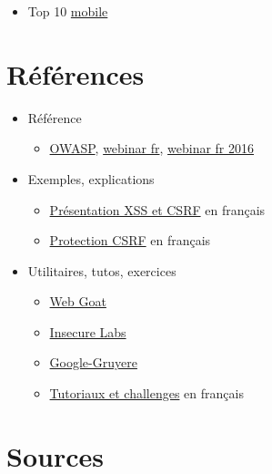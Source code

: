 \begin{itemize}
\tightlist
\item
  Top 10
  \href{https://www.owasp.org/index.php/Mobile_Top_10_2016-Top_10}{mobile}
\end{itemize}

\hypertarget{ruxe9fuxe9rences}{%
\section{Références}\label{ruxe9fuxe9rences}}

\begin{itemize}
\tightlist
\item
  Référence

  \begin{itemize}
  \tightlist
  \item
    \href{https://www.owasp.org/index.php/Main_Page}{OWASP},
    \href{https://www.youtube.com/watch?v=uJwoctrxyNs}{webinar fr},
    \href{https://www.youtube.com/watch?v=pHI2zitLph8}{webinar fr 2016}
  \end{itemize}
\item
  Exemples, explications

  \begin{itemize}
  \tightlist
  \item
    \href{http://www.journaldunet.com/developpeur/tutoriel/php/031030php_nexen-xss1.shtml}{Présentation
    XSS et CSRF} en français
  \item
    \href{http://www.apprendre-php.com/tutoriels/tutoriel-39-introduction-aux-cross-site-request-forgeries-ou-sea-surf.html}{Protection
    CSRF} en français
  \end{itemize}
\item
  Utilitaires, tutos, exercices

  \begin{itemize}
  \tightlist
  \item
    \href{https://www.owasp.org/index.php/Webgoat}{Web Goat}
  \item
    \href{http://www.insecurelabs.org/task}{Insecure Labs}
  \item
    \href{http://google-gruyere.appspot.com/}{Google-Gruyere}
  \item
    \href{https://www.securite-info.org/}{Tutoriaux et challenges} en
    français
  \end{itemize}
\end{itemize}

\hypertarget{sources}{%
\section{Sources}\label{sources}}
